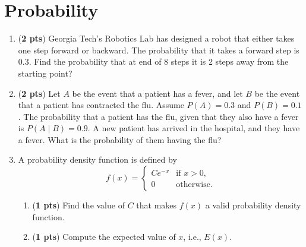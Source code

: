 \documentclass[11pt, letterpaper]{article}
\begin{document}
\newpage
\section{Probability}
\begin{enumerate}[label=(\alph*)]

\item (\textbf{2 pts}) Georgia Tech's Robotics Lab has designed a robot that either takes one step forward or backward. The probability that it takes a forward step is 0.3. Find the probability that at end of 8 steps it is 2 steps away from the starting point?


\item (\textbf{2 pts}) Let $A$ be the event that a patient has a fever, and let $B$ be the event that a patient has contracted the flu. Assume $P(A) = 0.3$ and $P(B) = 0.1$. The probability that a patient has the flu, given that they also have a fever is $P(A\mid B) = 0.9$. A new patient has arrived in the hospital, and they have a fever. What is the probability of them having the flu?

    \item
        A probability density function is defined by
        $$
	        f(x)=
	        \begin{cases}
		        Ce^{-x} & \text{if } x>0, \\
		        0 & \text{otherwise}.
	        \end{cases}
        $$
        \begin{enumerate}[label=(\roman*)]
	        \item (\textbf{1 pts}) Find the value of $C$ that makes $f(x)$ a valid probability density function.
	        \item (\textbf{1 pts}) Compute the expected value of $x$, i.e., $E(x)$.
        \end{enumerate}



\end{enumerate}
\end{document}
